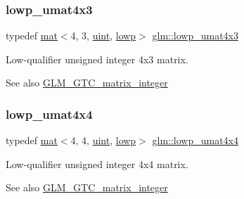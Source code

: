 \subsubsection{\texorpdfstring{lowp\+\_\+umat4x3}{lowp\_umat4x3}}
{\footnotesize\ttfamily typedef \hyperlink{structglm_1_1mat}{mat}$<$4, 3, \hyperlink{group__core__precision_ga4fd29415871152bfb5abd588334147c8}{uint}, \hyperlink{namespaceglm_a36ed105b07c7746804d7fdc7cc90ff25ae161af3fc695e696ce3bf69f7332bc2d}{lowp}$>$ \hyperlink{group__gtc__matrix__integer_ga5eb6bfe468dd615e0a78fb9f3ca813c6}{glm\+::lowp\+\_\+umat4x3}}

Low-\/qualifier unsigned integer 4x3 matrix. \begin{DoxySeeAlso}{See also}
\hyperlink{group__gtc__matrix__integer}{G\+L\+M\+\_\+\+G\+T\+C\+\_\+matrix\+\_\+integer} 
\end{DoxySeeAlso}
\mbox{\label{group__gtc__matrix__integer_ga4386ea62144a0c737b4789ed87df4177}} 
\subsubsection{\texorpdfstring{lowp\+\_\+umat4x4}{lowp\_umat4x4}}
{\footnotesize\ttfamily typedef \hyperlink{structglm_1_1mat}{mat}$<$4, 4, \hyperlink{group__core__precision_ga4fd29415871152bfb5abd588334147c8}{uint}, \hyperlink{namespaceglm_a36ed105b07c7746804d7fdc7cc90ff25ae161af3fc695e696ce3bf69f7332bc2d}{lowp}$>$ \hyperlink{group__gtc__matrix__integer_ga4386ea62144a0c737b4789ed87df4177}{glm\+::lowp\+\_\+umat4x4}}

Low-\/qualifier unsigned integer 4x4 matrix. \begin{DoxySeeAlso}{See also}
\hyperlink{group__gtc__matrix__integer}{G\+L\+M\+\_\+\+G\+T\+C\+\_\+matrix\+\_\+integer} 
\end{DoxySeeAlso}
\mbox{\label{group__gtc__matrix__integer_ga74e065ab9524e6b7bd5a84cffb758e71}} 
